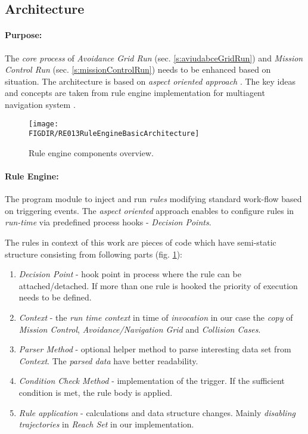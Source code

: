 \subsection{Architecture}\label{s:RuleEngineArchitecture}

\paragraph{Purpose:} The \emph{core process} of \emph{Avoidance Grid Run} (sec. \ref{s:aviudabceGridRun}) and \emph{Mission Control Run} (sec. \ref{s:missionControlRun}) needs to be enhanced based on  situation. The architecture is based on \emph{aspect oriented approach} \cite{hill2003jess}. The key ideas and concepts are taken from rule engine implementation for multiagent  navigation system \cite{seyboth2013event}.

\begin{figure}[H]
    \centering
    \texttt{[image: \\FIGDIR/RE013RuleEngineBasicArchitecture]}
    \caption{Rule engine components overview.}
    \label{fig:RuleEngineBasicArchitecture}
\end{figure}

\paragraph{Rule Engine:} The program module to inject and run \emph{rules} modifying standard work-flow based on  triggering events. The \emph{aspect oriented} approach enables to configure rules in \emph{run-time} via predefined process hooks - \emph{Decision Points}. 

The rules in context of this work are pieces of code which have semi-static structure consisting from following parts (fig. \ref{fig:RuleEngineBasicArchitecture}):

\begin{enumerate}
    \item \emph{Decision Point} - hook point in process where the rule can be attached/detached. If more than one rule is hooked the priority of execution needs to be defined. 
    
    \item \emph{Context} - the \emph{run time context} in time of \emph{invocation} in our case the \emph{copy} of \emph{Mission Control}, \emph{Avoidance/Navigation Grid} and \emph{Collision Cases}.
    
    \item \emph{Parser Method} - optional helper method to parse interesting data set from \emph{Context}. The \emph{parsed data} have better readability.
    
    \item \emph{Condition Check Method} - implementation of the trigger. If the sufficient condition is met, the rule body is applied.
    
    \item \emph{Rule application} - calculations and data structure changes. Mainly \emph{disabling trajectories} in \emph{Reach Set} in our implementation.     
\end{enumerate}

